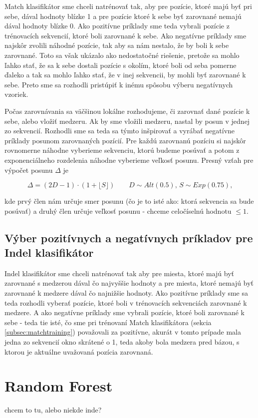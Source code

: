 Match klasifikátor sme chceli natrénovať tak, aby pre pozície, ktoré majú byť pri sebe, dával hodnoty blízke 1 a pre pozície ktoré k sebe byť zarovnané nemajú dával hodnoty blízke 0.
Ako pozitívne príklady sme teda vybrali pozície z trénovacích sekvencií, ktoré boli zarovnané k sebe. Ako negatívne príklady sme najskôr zvolili náhodné pozície, tak aby sa nám nestalo, že by boli k sebe zarovnané. Toto sa však ukázalo ako nedostatočné riešenie, pretože sa mohlo ľahko stať, že sa k sebe dostali pozície s okolím, ktoré boli od seba pomerne ďaleko a tak sa mohlo ľahko stať, že v inej sekvencii, by mohli byť zarovnané k sebe. Preto sme sa rozhodli pristúpiť k inému spôsobu výberu negatívnych vzoriek.

Počas zarovnávania sa väčšinou lokálne rozhodujeme, či zarovnať dané pozície k sebe, alebo vložiť medzeru. Ak by sme vložili medzeru, nastal by posun v jednej zo sekvencií. Rozhodli sme sa teda sa týmto inšpirovať a vyrábať negatívne príklady posunom zarovnaných pozícií. Pre každú zarovnanú pozíciu si najskôr rovnomerne náhodne vyberieme sekvenciu, ktorú budeme posúvať a potom z exponenciálneho rozdelenia náhodne vyberieme veľkosť posunu. Presný vzťah pre výpočet posunu $\Delta$ je

$$\Delta = \left(2D-1\right)\cdot \left(1+\lfloor S\rfloor\right)\qquad D\sim Alt(0.5),\, S\sim Exp(0.75),$$

kde prvý člen nám určuje smer posunu (čo je to isté ako: ktorá sekvencia sa bude posúvať) a druhý člen určuje veľkosť posunu - chceme celočíselnú hodnotu $\leq 1$.

\subsection{Výber pozitívnych a negatívnych príkladov pre Indel klasifikátor}

Indel klasifikátor sme chceli natrénovať tak aby pre miesta, ktoré majú byť zarovnané s medzerou dával čo najvyššie hodnoty a pre miesta, ktoré nemajú byť zarovnané k medzere dával čo najnižšie hodnoty. Ako pozitívne príklady sme sa teda rozhodli vyberať pozície, ktoré boli v trénovacích sekvenciách zarovnané k medzere. A ako negatívne príklady sme vybrali pozície, ktoré boli zarovnané k sebe - teda tie isté, čo sme pri trénovaní Match klasifikátora (sekcia \ref{subsec:matchtraining}) považovali za pozitívne, akurát v tomto prípade mala jedna zo sekvencií okno skrátené o 1, teda akoby bola medzera pred bázou, s ktorou je aktuálne uvažovaná pozícia zarovnaná.

\section{Random Forest}

\todo chcem to tu, alebo niekde inde?

\todo




